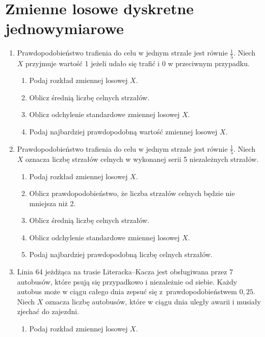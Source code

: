 \documentclass{mwart}
\newcommand{\ans}[1]{}
\begin{document}
\section{Zmienne losowe dyskretne jednowymiarowe}
\begin{enumerate}
\item Prawdopodobieństwo trafienia do celu w jednym strzale jest równie $\frac{1}{5}$. Niech $X$ przyjmuje wartość 1 jeżeli udało się trafić i 0 w przeciwnym przypadku.
\begin{enumerate}
\item Podaj rozkład zmiennej losowej $X$. \ans{$P(X=1)=p\quad P(X=0)=1-p$}
\item Oblicz średnią liczbę celnych strzałów. \ans{$EX=p=0{,}2$}
\item Oblicz odchylenie standardowe zmiennej losowej $X$. \ans{$DX=\sqrt{p(1-p)}=0{,}4$}
\item Podaj najbardziej prawdopodobną wartość zmiennej losowej $X$. \ans{$0$}
\end{enumerate}
\item Prawdopodobieństwo trafienia do celu w jednym strzale jest równie $\frac{1}{5}$. Niech $X$ oznacza liczbę strzałów celnych w wykonanej serii 5 niezależnych strzałów. 
\begin{enumerate}
\item Podaj rozkład zmiennej losowej $X$. \ans{$P(X=k)={5 \choose k}\frac{4^{5-k}}{5^5}$}
\item Oblicz prawdopodobieństwo, że liczba strzałów celnych będzie nie mniejsza niż 2. \ans{$P(X\geq 2)=1-P(X=0)-P(X=1)=1-\frac{4^5}{5^5}-5\cdot\frac{4^4}{5^5}=\frac{821}{3125}\approx0{,}263$}
\item Oblicz średnią liczbę celnych strzałów. \ans{$EX=np=1$}
\item Oblicz odchylenie standardowe zmiennej losowej $X$. \ans{$DX=\sqrt{np(1-p)}=\sqrt{\frac{4}{5}}$}
\item Podaj najbardziej prawdopodobną liczbę celnych strzałów. \ans{$\lfloor(n+1)p\rfloor=1$}
\end{enumerate}
\item Linia 64 jeżdżąca na trasie Literacka--Kacza jest obsługiwana przez 7 autobusów, które psują się przypadkowo i niezależnie od siebie. Każdy autobus może w ciągu całego dnia zepsuć się z~prawdopodobieństwem $0{,}25$. Niech $X$ oznacza liczbę autobusów, które w ciągu dnia uległy awarii i musiały zjechać do zajezdni.
\begin{enumerate}
\item Podaj rozkład zmiennej losowej $X$.

\end{enumerate}
\end{enumerate}
\end{document}
